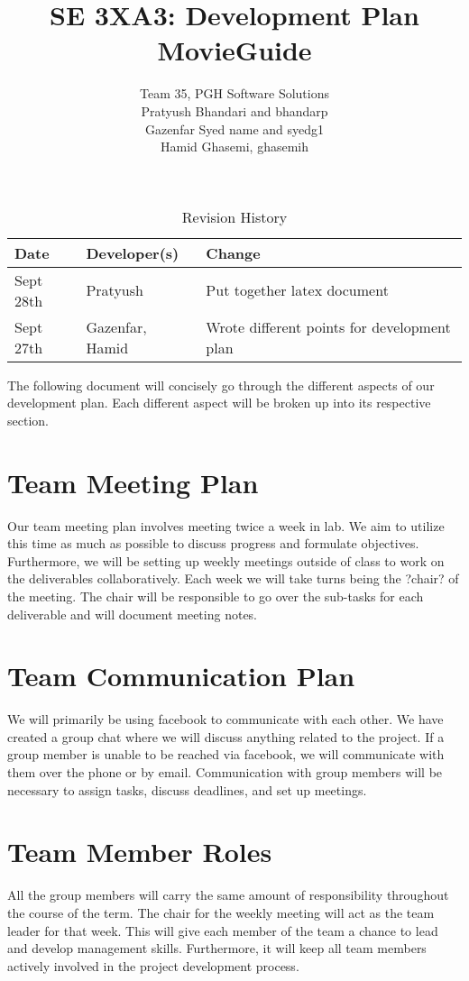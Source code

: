 \documentclass{article}
\title{SE 3XA3: Development Plan\\MovieGuide}
\author{Team 35, PGH Software Solutions
		\\ Pratyush Bhandari and bhandarp
		\\ Gazenfar Syed name and syedg1
		\\ Hamid Ghasemi, ghasemih
}
\date{}
\begin{document}
\begin{table}[hp]
\caption{Revision History} \label{TblRevisionHistory}
\begin{tabularx}{\textwidth}{llX}
\toprule
\textbf{Date} & \textbf{Developer(s)} & \textbf{Change}\\
\midrule
Sept 28th & Pratyush & Put together latex document\\
Sept 27th & Gazenfar, Hamid & Wrote different points for development plan\\
\bottomrule
\end{tabularx}
\end{table}

\newpage

\maketitle

The following document will concisely go through the different aspects of our development plan. Each different aspect will be broken up into its respective section.

\section{Team Meeting Plan}
Our team meeting plan involves meeting twice a week in lab. We aim to utilize this time as much as possible to discuss progress and formulate objectives. Furthermore, we will be setting up weekly meetings outside of class to work on the deliverables collaboratively. Each week we will take turns being the ?chair? of the meeting. The chair will be responsible to go over the sub-tasks for each deliverable and will document meeting notes.

\section{Team Communication Plan}
We will primarily be using facebook to communicate with each other. We have created a group chat where we will discuss anything related to the project. If a group member is unable to be reached via facebook, we will communicate with them over the phone or by email. Communication with group members will be necessary to assign tasks, discuss deadlines, and set up meetings. 


\section{Team Member Roles}
All the group members will carry the same amount of responsibility throughout the course of the term. The chair for the weekly meeting will act as the team leader for that week. This will give each member of the team a chance to lead and develop management skills. Furthermore, it will keep all team members actively involved in the project development process.
\end{document}
